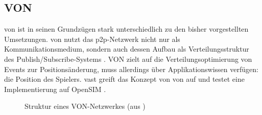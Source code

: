\subsection{VON}
\label{chap:related:von}
\ac{von} ist in seinen Grundzügen stark unterschiedlich zu den bisher vorgestellten Umsetzungen. \ac{von} nutzt das \ac{p2p}-Netzwerk nicht nur als Kommunikationsmedium, sondern auch dessen Aufbau als Verteilungsstruktur des Publish/Subscribe-Systems \cite{Hu2006VON}. VON zielt auf die Verteilungsoptimierung von Events zur Positionsänderung, muss allerdings über Applikationswissen verfügen: die Position des Spielers. \ac{vast} \cite{Backhaus2007Voronoibased} greift das Konzept von \ac{von} auf und testet eine Implementierung auf OpenSIM \cite{Baumgart2007OverSim}.

\begin{figure}[htbp]
\centering
{}
\caption{Struktur eines VON-Netzwerkes (aus \cite{Backhaus2007Voronoibased})}
\label{fig:von}
\end{figure}

